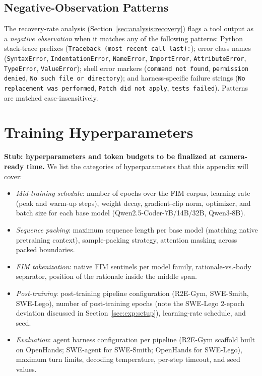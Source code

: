 \subsection{Negative-Observation Patterns}
\label{app:algo:neg_patterns}

The recovery-rate analysis (Section~\ref{sec:analysis:recovery}) flags
a tool output as a \emph{negative observation} when it matches any of
the following patterns: Python stack-trace prefixes
(\texttt{Traceback (most recent call last):}); error class names
(\texttt{SyntaxError}, \texttt{IndentationError}, \texttt{NameError},
\texttt{ImportError}, \texttt{AttributeError}, \texttt{TypeError},
\texttt{ValueError}); shell error markers
(\texttt{command not found}, \texttt{permission denied}, \texttt{No such file or directory});
and harness-specific failure strings
(\texttt{No replacement was performed}, \texttt{Patch did not apply},
\texttt{tests failed}). Patterns are matched case-insensitively.

\section{Training Hyperparameters}
\label{app:hp}

\textbf{Stub: hyperparameters and token budgets to be finalized at
camera-ready time.} We list the categories of hyperparameters that this
appendix will cover:

\begin{itemize}\setlength\itemsep{0.1em}
  \item \emph{Mid-training schedule}: number of epochs over the FIM
        corpus, learning rate (peak and warm-up steps), weight decay,
        gradient-clip norm, optimizer, and batch size for each base
        model (Qwen2.5-Coder-7B/14B/32B, Qwen3-8B).
  \item \emph{Sequence packing}: maximum sequence length per base
        model (matching native pretraining context), sample-packing
        strategy, attention masking across packed boundaries.
  \item \emph{FIM tokenization}: native FIM sentinels per model
        family, rationale-vs.-body separator, position of the rationale
        inside the middle span.
  \item \emph{Post-training}: post-training pipeline configuration
        (R2E-Gym, SWE-Smith, SWE-Lego), number of post-training epochs
        (note the SWE-Lego $2$-epoch deviation discussed in
        Section~\ref{sec:exp:setup}), learning-rate schedule, and seed.
  \item \emph{Evaluation}: agent harness configuration per pipeline
        (R2E-Gym scaffold built on OpenHands; SWE-agent for SWE-Smith;
        OpenHands for SWE-Lego), maximum turn limits, decoding
        temperature, per-step timeout, and seed values.
\end{itemize}

